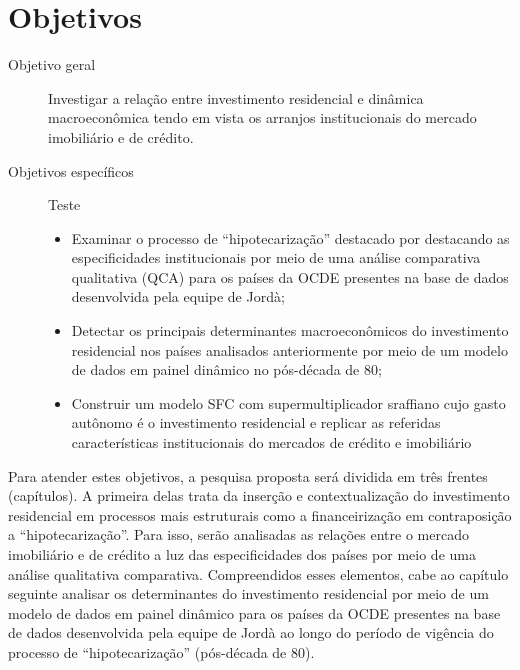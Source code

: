 \section{Objetivos}\label{OBJ}


\begin{description}
	\item[Objetivo geral] Investigar a relação entre investimento residencial e dinâmica macroeconômica tendo em vista os arranjos institucionais do mercado imobiliário e de crédito.
	\item[Objetivos específicos] {\color{white}Teste}
	\begin{itemize}
		\item Examinar o processo de ``hipotecarização'' destacado por \textcite{jorda_great_2014} destacando as especificidades institucionais por meio de uma análise comparativa qualitativa (QCA) para os países da OCDE presentes na base de dados desenvolvida pela equipe de Jordà;
		\item  Detectar os principais determinantes macroeconômicos do investimento residencial nos países analisados anteriormente por meio de um modelo de dados em painel dinâmico no pós-década de 80;
		\item Construir um modelo SFC com supermultiplicador sraffiano cujo gasto autônomo é o investimento residencial e replicar as referidas características institucionais do mercados de crédito e imobiliário
	\end{itemize}
\end{description}


Para atender estes objetivos, a pesquisa proposta será dividida em três frentes (capítulos).
A primeira delas trata da inserção e contextualização do investimento residencial em processos mais estruturais como a financeirização em contraposição a ``hipotecarização''. 
Para isso, serão analisadas as relações entre o mercado imobiliário e de crédito a luz das especificidades dos países por meio de uma análise qualitativa comparativa. Compreendidos esses elementos, cabe ao capítulo seguinte analisar os determinantes do investimento residencial por meio de um modelo de dados em painel dinâmico para os países da OCDE presentes na base de dados desenvolvida pela equipe de Jordà ao longo do período de vigência do processo de ``hipotecarização'' (pós-década de 80). 

